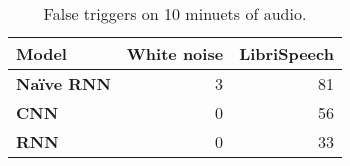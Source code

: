\begin{table}[H]
	\centering
	\caption{False triggers on 10 minuets of audio.}
	\begin{tabular}{l|rr}
		\toprule
		\textbf{Model}       & \textbf{White noise} & \textbf{LibriSpeech} \\
		\midrule
		\textbf{Naïve RNN}  & 3                    & 81                   \\
		\textbf{CNN        } & 0                    & 56                   \\
		\textbf{RNN        } & 0                    & 33                   \\
		\bottomrule
	\end{tabular}
	\label{tab:results_false_triggers}
\end{table}